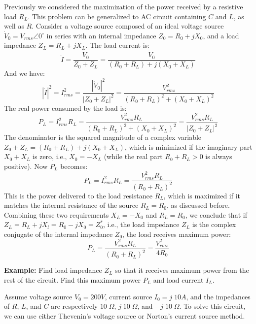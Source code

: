 \documentclass{article}
\begin{document}
Previously we considered the maximization of the power received by a
resistive load $R_L$. This problem can be generalized to AC circuit containing
$C$ and $L$, as well as $R$. Consider a voltage source composed of an ideal 
voltage source $\dot{V}_0=V_{rms}\angle 0^\circ$ in series with an internal 
impedance $Z_0=R_0+jX_0$, and a load impedance $Z_L=R_L+jX_L$. The load current
is:
\begin{equation}
  \dot{I}=\frac{\dot{V}_0}{Z_0+Z_L}=\frac{\dot{V}_0}{(R_0+R_L)+j(X_0+X_L)}  
\end{equation}
And we have:
\begin{equation}
  |\dot{I}|^2=I^2_{rms}=\frac{|\dot{V}_0|^2}{|Z_0+Z_L|^2}
  =\frac{V^2_{rms}}{(R_0+R_L)^2+(X_0+X_L)^2} 
\end{equation}
The real power consumed by the load is:
\begin{equation}
  P_L=I_{rms}^2 R_L =\frac{V^2_{rms}R_L}{(R_0+R_L)^2+(X_0+X_L)^2}
  =\frac{V^2_{rms}R_L}{|Z_0+Z_L|^2}
\end{equation}
The denominator is the squared magnitude of a complex variable
$Z_0+Z_L=(R_0+R_L)+j(X_0+X_L)$, which is minimized if the imaginary part 
$X_0+X_L$ is zero, i.e., $X_0=-X_L$ (while the real part $R_0+R_L>0$ is 
always positive). Now $P_L$ becomes:
\begin{equation}
  P_L=I_{rms}^2 R_L=\frac{V^2_{rms}R_L}{(R_0+R_L)^2} 
\end{equation}
This is the power delivered to the load resistance $R_L$, which is maximized
if it matches the internal resistance of the source $R_L=R_0$, as discussed 
before. Combining these two requirements $X_L=-X_0$ and $R_L=R_0$, we conclude
that if $Z_L=R_L+jX_l=R_0-jX_0=Z_0^*$, i.e., the load impedance $Z_L$ is the 
complex conjugate of the internal impedance $Z_0$, the load receives maximum
power:
\begin{equation}
  P_L=\frac{V^2_{rms}R_L}{(R_0+R_L)^2}=\frac{V_{rms}^2}{4R_0} 
\end{equation}

{\bf Example:}
Find load impedance $Z_L$ so that it receives maximum power from the rest 
of the circuit. Find this maximum power $P_L$ and load current $\dot{I}_L$.


Assume voltage source $V_0=200 V$, current source $I_0=j\;10 A$, and the 
impedances of $R$, $L$, and $C$ are respectively $10\;\Omega$, 
$j\;10\;\Omega$, and $-j\;10\;\Omega$. To solve this circuit, we can use 
either Thevenin's voltage source or Norton's current source method.
\end{document}
